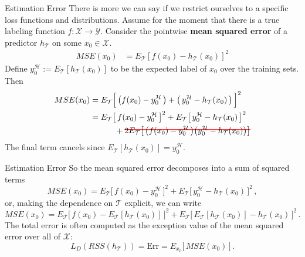 \documentclass[10pt, table, dvipsnames,handout]{beamer}
\newcommand\hcancel[2][black]{\setbox0=\hbox{$#2$}%
\rlap{\raisebox{.45\ht0}{\textcolor{#1}{\rule{\wd0}{1pt}}}}#2}
\newcommand{\cT}{\ensuremath{\mathcal{T}}}
\newcommand{\cX}{\ensuremath{\mathcal{X}}}
\newcommand{\cY}{\ensuremath{\mathcal{Y}}}
\newcommand{\cH}{\ensuremath{\mathcal{H}}}
\begin{document}
\begin{frame}[fragile]{Estimation Error}
There is more we can say if we restrict ourselves to a specific loss functions and distributions. Assume for the moment that there is a true labeling function $f:\cX\to\cY$.  Consider the pointwise \textbf{mean squared error} of a predictor $h_\cT$ on some $x_0\in \cX$. 
\begin{align*}
MSE(x_0) &= E_\cT[f(x_0)-h_\cT(x_0)]^2
\end{align*}
Define $y_0^\cH:=E_\cT[h_\cT(x_0)]$ to be the expected label of $x_0$ over the training sets. Then 
\begin{align*}
MSE(x_0) &=  E_\cT\Big[ \,\big(f(x_0) - y_0^\cH\,\big)+ \big(\, y_0^\cH - h_\cT(x_0)\,\big)\, \Big]^2
\\
&= E_\cT\big[ \,f(x_0) - y_0^\cH\,\big]^2 +  E_\cT \big[\, y_0^\cH - h_\cT(x_0)\,\big]^2 
\\
&\hspace{3em}+ \hcancel[red]{2 E_\cT\big[ \,\big(f(x_0) - y_0^\cH\,\big) \big(y_0^\cH - h_\cT(x_0)\big) \big] }
\end{align*}
The final term cancels since $E_\cT [h_\cT(x_0)] = y_0^\cH$. 
\end{frame}









\begin{frame}[fragile]{Estimation Error}
So the mean squared error decomposes into a sum of squared terms
$$
MSE(x_0) = E_\cT\big[ \,f(x_0) - y_0^\cH\,\big]^2 +  E_\cT \big[\, y_0^\cH - h_\cT(x_0)\,\big]^2 \,,
$$\pause
or, making the dependence on $\cT$ explicit, we can write
$$
MSE(x_0) = E_\cT\big[ \,f(x_0) - E_\cT[h_\cT(x_0)]\,\big]^2 +  E_\cT \big[\, E_\cT[h_\cT(x_0)] - h_\cT(x_0)\,\big]^2 \,.
$$\pause
The total error is often computed as the exception value of the mean squared error over all of $\cX$:
$$
L_{D}(RSS(h_\cT)) = \text{Err} = E_{x_0}\big[\, MSE(x_0) \,\big]\,.
$$
\end{frame}
\end{document}
